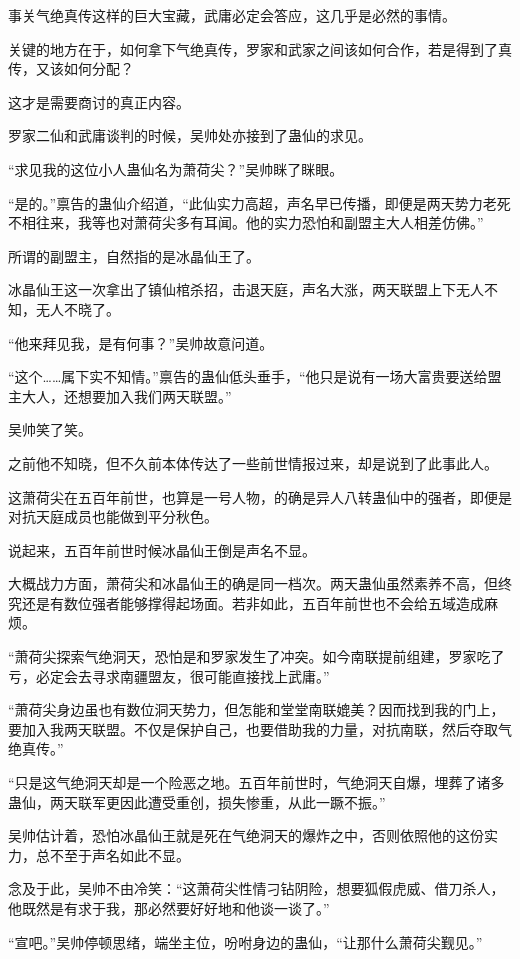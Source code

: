 \begin{this_body}
事关气绝真传这样的巨大宝藏，武庸必定会答应，这几乎是必然的事情。

关键的地方在于，如何拿下气绝真传，罗家和武家之间该如何合作，若是得到了真传，又该如何分配？

这才是需要商讨的真正内容。

罗家二仙和武庸谈判的时候，吴帅处亦接到了蛊仙的求见。

“求见我的这位小人蛊仙名为萧荷尖？”吴帅眯了眯眼。

“是的。”禀告的蛊仙介绍道，“此仙实力高超，声名早已传播，即便是两天势力老死不相往来，我等也对萧荷尖多有耳闻。他的实力恐怕和副盟主大人相差仿佛。”

所谓的副盟主，自然指的是冰晶仙王了。

冰晶仙王这一次拿出了镇仙棺杀招，击退天庭，声名大涨，两天联盟上下无人不知，无人不晓了。

“他来拜见我，是有何事？”吴帅故意问道。

“这个……属下实不知情。”禀告的蛊仙低头垂手，“他只是说有一场大富贵要送给盟主大人，还想要加入我们两天联盟。”

吴帅笑了笑。

之前他不知晓，但不久前本体传达了一些前世情报过来，却是说到了此事此人。

这萧荷尖在五百年前世，也算是一号人物，的确是异人八转蛊仙中的强者，即便是对抗天庭成员也能做到平分秋色。

说起来，五百年前世时候冰晶仙王倒是声名不显。

大概战力方面，萧荷尖和冰晶仙王的确是同一档次。两天蛊仙虽然素养不高，但终究还是有数位强者能够撑得起场面。若非如此，五百年前世也不会给五域造成麻烦。

“萧荷尖探索气绝洞天，恐怕是和罗家发生了冲突。如今南联提前组建，罗家吃了亏，必定会去寻求南疆盟友，很可能直接找上武庸。”

“萧荷尖身边虽也有数位洞天势力，但怎能和堂堂南联媲美？因而找到我的门上，要加入我两天联盟。不仅是保护自己，也要借助我的力量，对抗南联，然后夺取气绝真传。”

“只是这气绝洞天却是一个险恶之地。五百年前世时，气绝洞天自爆，埋葬了诸多蛊仙，两天联军更因此遭受重创，损失惨重，从此一蹶不振。”

吴帅估计着，恐怕冰晶仙王就是死在气绝洞天的爆炸之中，否则依照他的这份实力，总不至于声名如此不显。

念及于此，吴帅不由冷笑：“这萧荷尖性情刁钻阴险，想要狐假虎威、借刀杀人，他既然是有求于我，那必然要好好地和他谈一谈了。”

“宣吧。”吴帅停顿思绪，端坐主位，吩咐身边的蛊仙，“让那什么萧荷尖觐见。”

\end{this_body}

